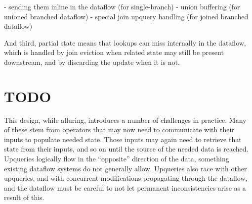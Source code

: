  - sending them inline in the dataflow (for single-branch)
 - union buffering (for unioned branched dataflow)
 - special join upquery handling (for joined branched dataflow)

And third, partial state means that lookups can miss internally in the
dataflow, which is handled by join eviction when related state may still be
present downstream, and by discarding the update when it is not.

\section{TODO}

This design, while alluring, introduces a number of challenges in practice. Many
of these stem from operators that may now need to communicate with their inputs
to populate needed state. Those inputs may again need to retrieve that state
from their inputs, and so on until the source of the needed data is reached.
Upqueries logically flow in the ``opposite'' direction of the data, something
existing dataflow systems do not generally allow. Upqueries also race with other
upqueries, and with concurrent modifications propagating through the dataflow,
and the dataflow must be careful to not let permanent inconsistencies arise as a
result of this.

%
%
